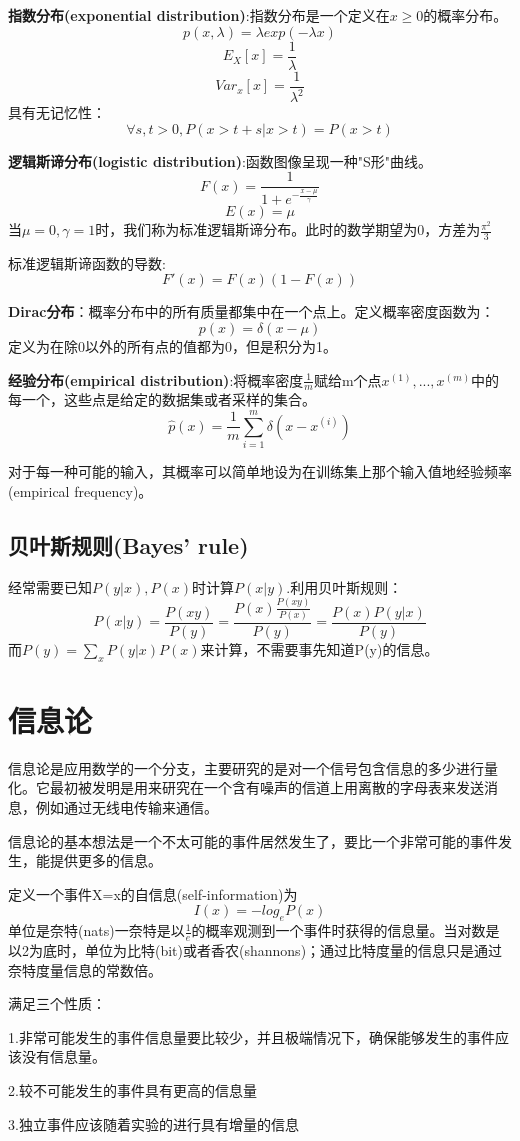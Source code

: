\documentclass[openbib]{article}
\begin{document}
\textbf{指数分布(exponential distribution)}:指数分布是一个定义在$x\ge0$的概率分布。
$$p(x,\lambda)=\lambda exp(-\lambda x)$$
$$E_X[x]=\frac{1}{\lambda}$$
$$Var_x[x]=\frac{1}{\lambda^2}$$
具有无记忆性：
$$\forall s,t>0,P(x>t+s|x>t)=P(x>t)$$

\textbf{逻辑斯谛分布(logistic distribution)}:函数图像呈现一种"S形"曲线。
$$F(x)=\frac{1}{1+e^{-\frac{x-\mu}{\gamma}}}$$
$$E(x)=\mu$$
当$\mu=0,\gamma=1$时，我们称为标准逻辑斯谛分布。此时的数学期望为0，方差为$\frac{\pi^2}{3}$

标准逻辑斯谛函数的导数:$$F'(x)=F(x)(1-F(x))$$

\textbf{Dirac分布}：概率分布中的所有质量都集中在一个点上。定义概率密度函数为：$$p(x)=\delta(x-\mu)$$
定义为在除0以外的所有点的值都为0，但是积分为1。

\textbf{经验分布(empirical distribution)}:将概率密度$\frac{1}{m}$赋给m个点$x^{(1)},...,x^{(m)}$中的每一个，这些点是给定的数据集或者采样的集合。
$$\hat{p}(x)=\frac{1}{m}\sum_{i=1}^{m}\delta(x-x^{(i)})$$

对于每一种可能的输入，其概率可以简单地设为在训练集上那个输入值地经验频率(empirical frequency)。

\subsection{贝叶斯规则(Bayes' rule)}
经常需要已知$P(y|x),P(x)$时计算$P(x|y)$.利用贝叶斯规则：
$$P(x|y)=\frac{P(xy)}{P(y)}=\frac{P(x)\frac{P(xy)}{P(x)}}{P(y)}=\frac{P(x)P(y|x)}{P(y)}$$
而$P(y)=\sum_{x}P(y|x)P(x)$来计算，不需要事先知道P(y)的信息。
\section{信息论}
信息论是应用数学的一个分支，主要研究的是对一个信号包含信息的多少进行量化。它最初被发明是用来研究在一个含有噪声的信道上用离散的字母表来发送消息，例如通过无线电传输来通信。

信息论的基本想法是一个不太可能的事件居然发生了，要比一个非常可能的事件发生，能提供更多的信息。

定义一个事件X=x的自信息(self-information)为
$$I(x)=-log_eP(x)$$
单位是奈特(nats)一奈特是以$\frac{1}{e}$的概率观测到一个事件时获得的信息量。当对数是以2为底时，单位为比特(bit)或者香农(shannons)；通过比特度量的信息只是通过奈特度量信息的常数倍。

满足三个性质：

1.非常可能发生的事件信息量要比较少，并且极端情况下，确保能够发生的事件应该没有信息量。

2.较不可能发生的事件具有更高的信息量

3.独立事件应该随着实验的进行具有增量的信息
\end{document}
